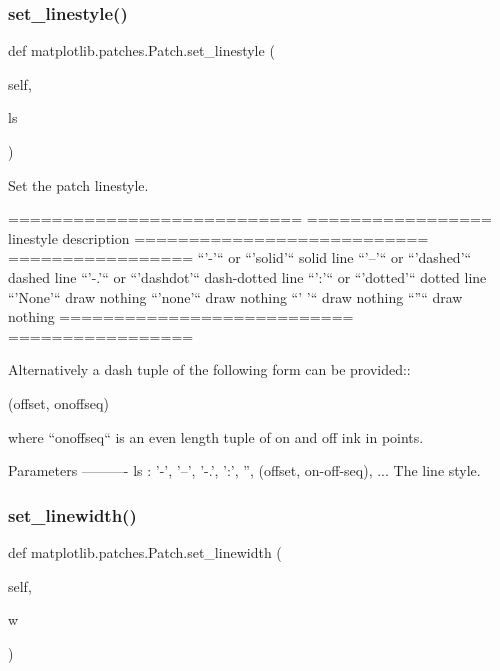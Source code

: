 \subsubsection{\texorpdfstring{set\+\_\+linestyle()}{set\_linestyle()}}
{\footnotesize\ttfamily def matplotlib.\+patches.\+Patch.\+set\+\_\+linestyle (\begin{DoxyParamCaption}\item[{}]{self,  }\item[{}]{ls }\end{DoxyParamCaption})}

\begin{DoxyVerb}Set the patch linestyle.

===========================   =================
linestyle                     description
===========================   =================
``'-'`` or ``'solid'``        solid line
``'--'`` or  ``'dashed'``     dashed line
``'-.'`` or  ``'dashdot'``    dash-dotted line
``':'`` or ``'dotted'``       dotted line
``'None'``                    draw nothing
``'none'``                    draw nothing
``' '``                       draw nothing
``''``                        draw nothing
===========================   =================

Alternatively a dash tuple of the following form can be provided::

    (offset, onoffseq)

where ``onoffseq`` is an even length tuple of on and off ink in points.

Parameters
----------
ls : {'-', '--', '-.', ':', '', (offset, on-off-seq), ...}
    The line style.
\end{DoxyVerb}
 \mbox{\label{classmatplotlib_1_1patches_1_1Patch_ae458615c2f8ccc07d057dd669afb0239}} 
\subsubsection{\texorpdfstring{set\+\_\+linewidth()}{set\_linewidth()}}
{\footnotesize\ttfamily def matplotlib.\+patches.\+Patch.\+set\+\_\+linewidth (\begin{DoxyParamCaption}\item[{}]{self,  }\item[{}]{w }\end{DoxyParamCaption})}

